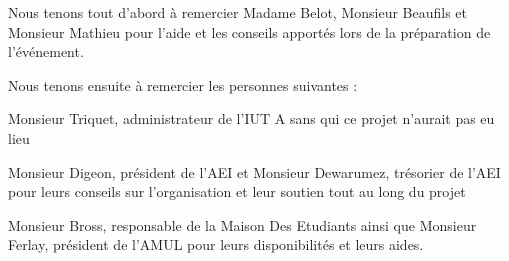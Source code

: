 Nous tenons tout d'abord à remercier Madame Belot, Monsieur Beaufils et Monsieur Mathieu
pour l'aide et les conseils apportés lors de la préparation de l'événement.

Nous tenons ensuite à remercier les personnes suivantes : 

Monsieur Triquet, administrateur de l'IUT A sans qui ce projet n'aurait pas eu lieu

Monsieur Digeon, président de l'AEI et Monsieur Dewarumez, trésorier de l'AEI pour leurs conseils
sur l'organisation et leur soutien tout au long du projet

Monsieur Bross, responsable de la Maison Des Etudiants ainsi que Monsieur Ferlay, président de l'AMUL
pour leurs disponibilités et leurs aides.
